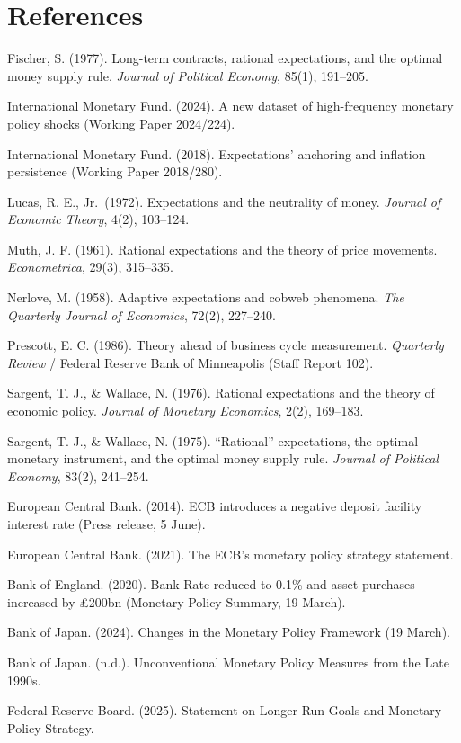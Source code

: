 \documentclass[
  letterpaper,
  DIV=11,
  numbers=noendperiod]{scrartcl}
\begin{document}
\section{References}\label{references}

Fischer, S. (1977). Long-term contracts, rational expectations, and the
optimal money supply rule. \emph{Journal of Political Economy}, 85(1),
191--205.

International Monetary Fund. (2024). A new dataset of high-frequency
monetary policy shocks (Working Paper 2024/224).

International Monetary Fund. (2018). Expectations' anchoring and
inflation persistence (Working Paper 2018/280).

Lucas, R. E., Jr.~(1972). Expectations and the neutrality of money.
\emph{Journal of Economic Theory}, 4(2), 103--124.

Muth, J. F. (1961). Rational expectations and the theory of price
movements. \emph{Econometrica}, 29(3), 315--335.

Nerlove, M. (1958). Adaptive expectations and cobweb phenomena.
\emph{The Quarterly Journal of Economics}, 72(2), 227--240.

Prescott, E. C. (1986). Theory ahead of business cycle measurement.
\emph{Quarterly Review} / Federal Reserve Bank of Minneapolis (Staff
Report 102).

Sargent, T. J., \& Wallace, N. (1976). Rational expectations and the
theory of economic policy. \emph{Journal of Monetary Economics}, 2(2),
169--183.

Sargent, T. J., \& Wallace, N. (1975). ``Rational'' expectations, the
optimal monetary instrument, and the optimal money supply rule.
\emph{Journal of Political Economy}, 83(2), 241--254.

European Central Bank. (2014). ECB introduces a negative deposit
facility interest rate (Press release, 5 June).

European Central Bank. (2021). The ECB's monetary policy strategy
statement.

Bank of England. (2020). Bank Rate reduced to 0.1\% and asset purchases
increased by £200bn (Monetary Policy Summary, 19 March).

Bank of Japan. (2024). Changes in the Monetary Policy Framework (19
March).

Bank of Japan. (n.d.). Unconventional Monetary Policy Measures from the
Late 1990s.

Federal Reserve Board. (2025). Statement on Longer-Run Goals and
Monetary Policy Strategy.
\end{document}
